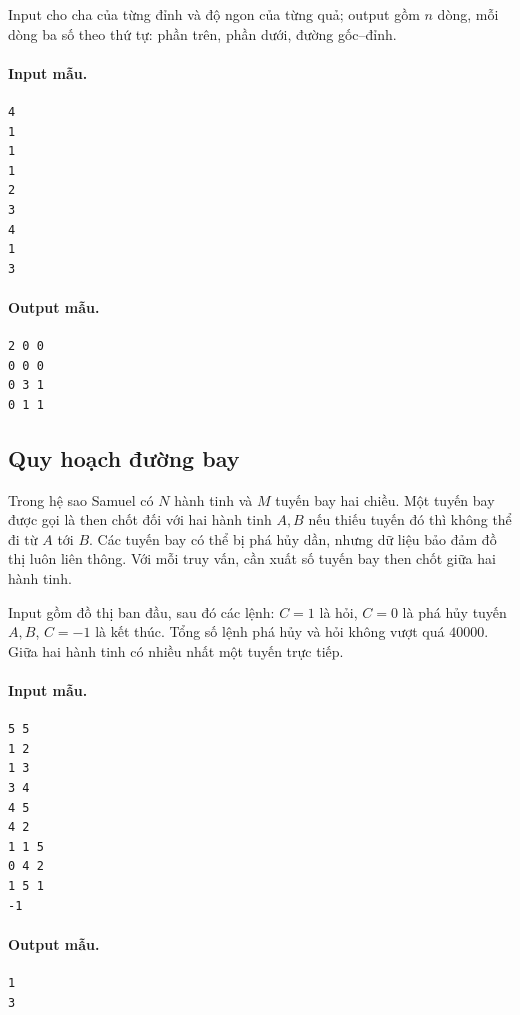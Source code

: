\documentclass[11pt]{article}
\begin{document}
Input cho cha của từng đỉnh và độ ngon của từng quả; output gồm \(n\) dòng,
mỗi dòng ba số theo thứ tự: phần trên, phần dưới, đường gốc--đỉnh.

\paragraph{Input mẫu.}
\begin{verbatim}
4
1
1
1
2
3
4
1
3
\end{verbatim}

\paragraph{Output mẫu.}
\begin{verbatim}
2 0 0
0 0 0
0 3 1
0 1 1
\end{verbatim}

\subsection*{Quy hoạch đường bay}

Trong hệ sao Samuel có \(N\) hành tinh và \(M\) tuyến bay hai chiều. Một tuyến
bay được gọi là then chốt đối với hai hành tinh \(A,B\) nếu thiếu tuyến đó thì
không thể đi từ \(A\) tới \(B\). Các tuyến bay có thể bị phá hủy dần, nhưng dữ
liệu bảo đảm đồ thị luôn liên thông. Với mỗi truy vấn, cần xuất số tuyến bay
then chốt giữa hai hành tinh.

Input gồm đồ thị ban đầu, sau đó các lệnh: \(C=1\) là hỏi, \(C=0\) là phá hủy
tuyến \(A,B\), \(C=-1\) là kết thúc. Tổng số lệnh phá hủy và hỏi không vượt quá
\(40000\). Giữa hai hành tinh có nhiều nhất một tuyến trực tiếp.

\paragraph{Input mẫu.}
\begin{verbatim}
5 5
1 2
1 3
3 4
4 5
4 2
1 1 5
0 4 2
1 5 1
-1
\end{verbatim}

\paragraph{Output mẫu.}
\begin{verbatim}
1
3
\end{verbatim}
\end{document}
